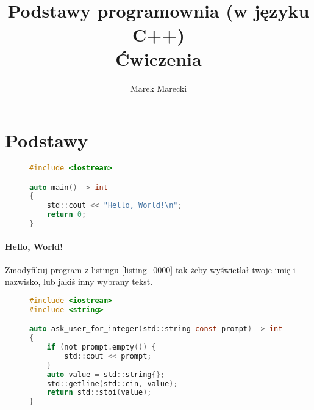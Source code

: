 \documentclass[11pt,a4paper,titlepage,onecolumn]{article}
\author{Marek Marecki}
\title{Podstawy programownia (w języku C++)\\{\Large Ćwiczenia}}
\begin{document}
\maketitle

\tableofcontents
\lstlistoflistings

\newpage


\section{Podstawy}

\begin{figure}[!htp]
\begin{lstlisting}[caption={Hello, World!},
    captionpos=b,
    label=listing_0000,
    language=c]
#include <iostream>

auto main() -> int
{
    std::cout << "Hello, World!\n";
    return 0;
}
\end{lstlisting}
\end{figure}

\paragraph{Hello, World!} Zmodyfikuj program z listingu
\ref{listing_0000} tak żeby wyświetlał twoje imię i nazwisko, lub
jakiś inny wybrany tekst.

\begin{figure}[!htp]
\begin{lstlisting}[caption={Hello, World!},
    captionpos=b,
    label=listing_0001,
    language=c]
#include <iostream>
#include <string>

auto ask_user_for_integer(std::string const prompt) -> int
{
    if (not prompt.empty()) {
        std::cout << prompt;
    }
    auto value = std::string{};
    std::getline(std::cin, value);
    return std::stoi(value);
}
\end{lstlisting}
\end{figure}
\end{document}
